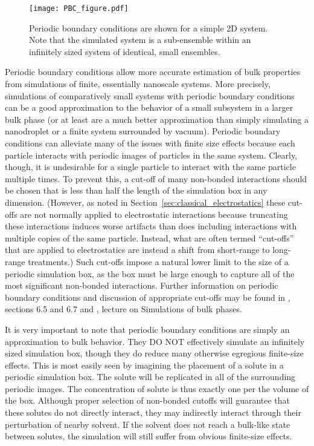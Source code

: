 \documentclass[9pt,bestpractices]{livecoms}
\begin{document}
\begin{figure}[h]
\centering
\texttt{[image: PBC\_figure.pdf]}
\caption{Periodic boundary conditions are shown for a simple 2D system. Note that the simulated system is a sub-ensemble within an infinitely sized system of identical, small ensembles.}
\label{pbcfig}
\end{figure}

Periodic boundary conditions allow more accurate estimation of bulk properties from simulations of finite, essentially nanoscale systems.
More precisely, simulations of comparatively small systems with periodic boundary conditions can be a good approximation to the behavior of a small subsystem in a larger bulk phase (or at least are a much better approximation than simply simulating a nanodroplet or a finite system surrounded by vacuum).
Periodic boundary conditions can alleviate many of the issues with finite size effects because each particle interacts with periodic images of particles in the same system.
Clearly, though, it is undesirable for a single particle to interact with the same particle multiple times.
To prevent this, a cut-off of many non-bonded interactions should be chosen that is less than half the length of the simulation box in any dimension.
(However, as noted in Section~\ref{sec:classical_electrostatics} these cut-offs are not normally applied to electrostatic interactions because truncating these interactions induces worse artifacts than does including interactions with multiple copies of the same particle. 
Instead, what are often termed ``cut-offs'' that are applied to electrostatics are instead a shift from short-range to long-range treatments.)
Such cut-offs impose a natural lower limit to the size of a periodic simulation box, as the box must be large enough to capture all of the most significant non-bonded interactions.
Further information on periodic boundary conditions and discussion of appropriate cut-offs may be found in \citet{2001Leach}, sections 6.5 and 6.7 and \citet{ShellNotes}, lecture on Simulations of bulk phases.

It is very important to note that periodic boundary conditions are simply an approximation to bulk behavior.
They DO NOT effectively simulate an infinitely sized simulation box, though they do reduce many otherwise egregious finite-size effects.
This is most easily seen by imagining the placement of a solute in a periodic simulation box.
The solute will be replicated in all of the surrounding periodic images.
The concentration of solute is thus exactly one per the volume of the box.
Although proper selection of non-bonded cutoffs will guarantee that these solutes do not directly interact, they may indirectly interact through their perturbation of nearby solvent.
If the solvent does not reach a bulk-like state between solutes, the simulation will still suffer from obvious finite-size effects.
\end{document}
